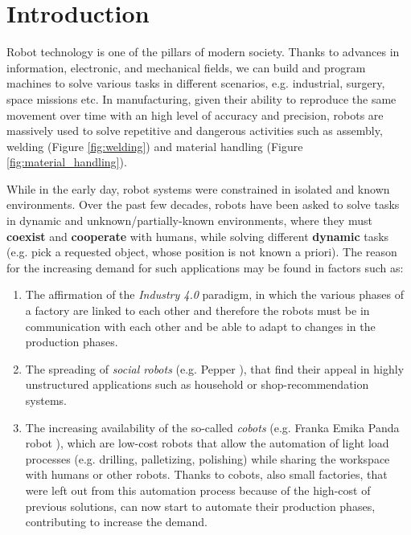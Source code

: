 \section{Introduction}
\label{sec:intro}
Robot technology is one of the pillars of modern society. Thanks to advances in information, electronic, and
mechanical fields, we can build and program machines to solve various tasks in different scenarios, e.g. industrial,
surgery, space missions etc. \newline In manufacturing, given their ability to reproduce the same movement over time
with an high level of accuracy and precision, robots are massively used to solve repetitive and dangerous activities
such as assembly, welding (Figure \ref{fig:welding}) and material handling    (Figure \ref{fig:material_handling}).

\noindent While in the early day, robot systems were constrained in isolated and known environments. Over the past few
decades, robots have been asked to solve tasks in dynamic and unknown/partially-known environments, where they must
\textbf{coexist} and \textbf{cooperate} with humans, while  solving different \textbf{dynamic} tasks (e.g. pick a
requested object, whose position is not known a priori). \newline The reason for the increasing demand for such
applications may be found in factors such as:
\begin{enumerate}[label=(\alph*)]
    \item The affirmation of the \textit{Industry 4.0} paradigm, in which the various phases of a factory are linked to
          each other and therefore the robots must be in communication with each other and be able to adapt to changes in the
          production phases.
    \item The spreading of \textit{social robots} (e.g. Pepper \cite{pepper}), that find their appeal in highly
          unstructured applications such as household or shop-recommendation systems.
    \item The increasing availability of the so-called \textit{cobots} (e.g. Franka Emika Panda robot \cite{panda}),
          which are low-cost robots that allow the automation of light load processes (e.g. drilling, palletizing, polishing)
          while sharing the workspace with humans or other robots. Thanks to cobots, also small factories, that were left out
          from this automation process because of the high-cost of previous solutions, can now start to automate their
          production phases, contributing to increase the demand.
\end{enumerate}
